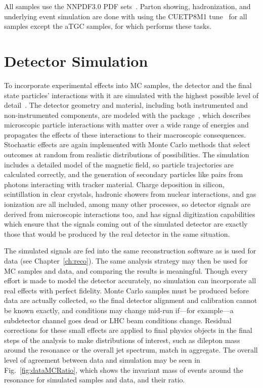 All samples use the NNPDF3.0 PDF sets~\cite{Ball:2014uwa}.
Parton showing, hadronization, and underlying event simulation are done with {\PYTHIA} using the CUETP8M1 tune~\cite{Khachatryan:2015pea} for all samples except the aTGC samples, for which {\SHERPA} performs these tasks.


\section{Detector Simulation}

To incorporate experimental effects into MC samples, the detector and the final state particles' interactions with it are simulated with the highest possible level of detail~\cite{Banerjee:1742-6596-396-2-022003, Hildreth:1742-6596-664-7-072022}.
The detector geometry and material, including both instrumented and non-instrumented components, are modeled with the {\GEANTfour} package~\cite{Agostinelli:2002hh}, which describes microscopic particle interactions with matter over a wide range of energies and propagates the effects of these interactions to their macroscopic consequences.
Stochastic effects are again implemented with Monte Carlo methods that select outcomes at random from realistic distributions of possibilities.
The {\GEANTfour} simulation includes a detailed model of the magnetic field, so particle trajectories are calculated correctly, and the generation of secondary particles like {\epem} pairs from photons interacting with tracker material.
Charge deposition in silicon, scintillation in clear crystals, hadronic showers from nuclear interactions, and gas ionization are all included, among many other processes, so detector signals are derived from microscopic interactions too, and {\GEANTfour} has signal digitization capabilities which ensure that the signals coming out of the simulated detector are exactly those that would be produced by the real detector in the same situation.

The simulated signals are fed into the same reconstruction software as is used for data (see Chapter~\ref{ch:reco}).
The same analysis strategy may then be used for MC samples and data, and comparing the results is meaningful.
Though every effort is made to model the detector accurately, no simulation can incorporate all real effects with perfect fidelity.
Monte Carlo samples must be produced before data are actually collected, so the final detector alignment and calibration cannot be known exactly, and conditions may change mid-run if---for example---a subdetector channel goes dead or LHC beam conditions change.
Residual corrections for these small effects are applied to final physics objects in the final steps of the analysis to make distributions of interest, such as dilepton mass around the {\PZ} resonance or the overall jet {\pt} spectrum, match in aggregate.
The overall level of agreement between data and simulation may be seen in Fig.~\ref{fig:dataMCRatio}, which shows the invariant mass of {\epem} events around the {\PZ} resonance for simulated samples and data, and their ratio.

